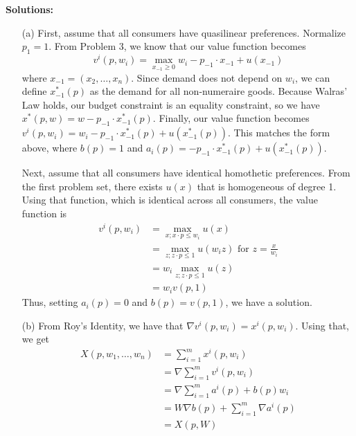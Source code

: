 \documentclass[12pt]{article}
\begin{document}
\textbf{Solutions:}

\begin{itemize}
    \item[(a)] First, assume that all consumers have quasilinear preferences. Normalize $p_1 = 1$. From Problem 3, we know that our value function becomes
    \[
    v^i(p,w_i) = \max_{x_{-1} \ge 0} w_i - p_{-1}\cdot x_{-1} + u(x_{-1})
    \]
    where $x_{-1} = (x_2,\dots,x_n)$. Since demand does not depend on $w_i$, we can define $x_{-1}^*(p)$ as the demand for all non-numeraire goods. Because Walras' Law holds, our budget constraint is an equality constraint, so we have $x^*(p,w) = w - p_{-1} \cdot x^*_{-1}(p)$. Finally, our value function becomes $v^i(p,w_i) = w_i - p_{-1}\cdot x^*_{-1}(p) + u(x_{-1}^*(p))$. This matches the form above, where $b(p) = 1$ and $a_i(p) = - p_{-1}\cdot x^*_{-1}(p) + u(x_{-1}^*(p))$.

    \smallskip

    Next, assume that all consumers have identical homothetic preferences. From the first problem set, there exists $u(x)$ that is homogeneous of degree 1. Using that function, which is identical across all consumers, the value function is
    \begin{align*}
        v^i(p,w_i) &= \max_{x ; x\cdot p \le w_i} u(x) \\
                &= \max_{z ; z\cdot p \le 1} u(w_iz) \text{  for } z = \frac{x}{w_i} \\
                &= w_i \max_{z ; z\cdot p \le 1} u(z) \\
                &= w_i v(p,1)
    \end{align*}
    Thus, setting $a_i(p) = 0$ and $b(p) = v(p,1)$, we have a solution.

    \item[(b)] From Roy's Identity, we have that $\nabla v^i(p,w_i) = x^i(p,w_i)$. Using that, we get
    \begin{align*}
        X(p,w_1,\dots,w_n) &= \sum_{i=1}^m x^i(p,w_i) \\
        &= \nabla \sum_{i=1}^m v^i(p,w_i) \\
        &= \nabla \sum_{i=1}^m a^i(p) + b(p)w_i \\
        &= W\nabla b(p) + \sum_{i=1}^m \nabla a^i(p) \\
        &= X(p,W)
    \end{align*}


\end{itemize}
\end{document}
